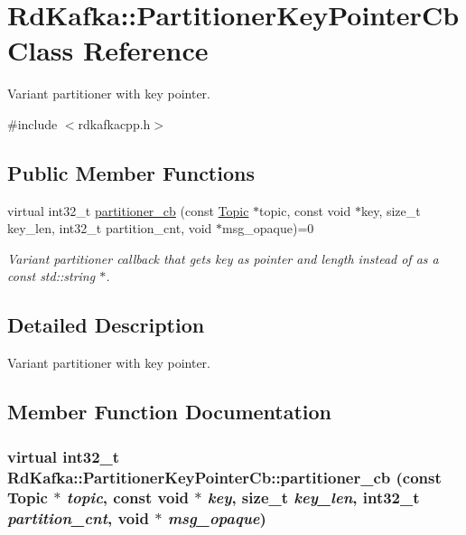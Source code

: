 \hypertarget{classRdKafka_1_1PartitionerKeyPointerCb}{
\section{RdKafka::PartitionerKeyPointerCb Class Reference}
\label{classRdKafka_1_1PartitionerKeyPointerCb}
}


Variant partitioner with key pointer.  


{\ttfamily \#include $<$rdkafkacpp.h$>$}\subsection*{Public Member Functions}
\begin{DoxyCompactItemize}
\item 
virtual int32\_\-t \hyperlink{classRdKafka_1_1PartitionerKeyPointerCb_a344e51bd3974cc4808bfea02e45e94e1}{partitioner\_\-cb} (const \hyperlink{classRdKafka_1_1Topic}{Topic} $\ast$topic, const void $\ast$key, size\_\-t key\_\-len, int32\_\-t partition\_\-cnt, void $\ast$msg\_\-opaque)=0
\begin{DoxyCompactList}\small\item\em Variant partitioner callback that gets {\ttfamily key} as pointer and length instead of as a const std::string $\ast$. \item\end{DoxyCompactList}\end{DoxyCompactItemize}


\subsection{Detailed Description}
Variant partitioner with key pointer. 

\subsection{Member Function Documentation}
\hypertarget{classRdKafka_1_1PartitionerKeyPointerCb_a344e51bd3974cc4808bfea02e45e94e1}{
\subsubsection[{partitioner\_\-cb}]{\setlength{\rightskip}{0pt plus 5cm}virtual int32\_\-t RdKafka::PartitionerKeyPointerCb::partitioner\_\-cb (const {\bf Topic} $\ast$ {\em topic}, \/  const void $\ast$ {\em key}, \/  size\_\-t {\em key\_\-len}, \/  int32\_\-t {\em partition\_\-cnt}, \/  void $\ast$ {\em msg\_\-opaque})}}
\label{classRdKafka_1_1PartitionerKeyPointerCb_a344e51bd3974cc4808bfea02e45e94e1}


